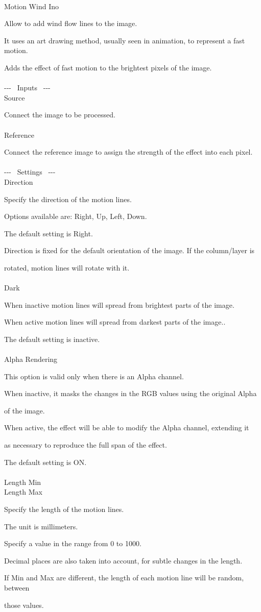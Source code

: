 \documentclass[a4paper,12pt]{article}
\begin{document}
\thispagestyle{empty}

\Large
\noindent \\
Motion Wind Ino\medskip
\par
\normalsize
Allow to add wind flow lines to the image.
\par
It uses an art drawing method, usually seen in animation, to represent a fast motion.\par
Adds the effect of fast motion to the brightest pixels of the image.\\
\\
-{-}- \ Inputs \ -{-}-\\
Source\par
Connect the image to be processed.\\
\\
Reference\par
Connect the reference image to assign the strength of the effect into each pixel.\\
\\
-{-}- \ Settings \ -{-}-\\
Direction\par
Specify the direction of the motion lines.\par
Options available are: Right, Up, Left, Down.\par
The default setting is Right.\par
Direction is fixed for the default orientation of the image. If the column/layer is\par 
rotated, motion lines will rotate with it.\\
\\
Dark\par
When inactive motion lines will spread from brightest parts of the image.\par
When active motion lines will spread from darkest parts of the image..\par
The default setting is inactive.\\
\\
Alpha Rendering\par
This option is valid only when there is an Alpha channel.\par
When inactive, it masks the changes in the RGB values using the original Alpha\par 
of the image.\par
When active, the effect will be able to modify the Alpha channel, extending it\par 
as necessary to reproduce the full span of the effect.\par
The default setting is ON.\\
\\
Length Min\\
Length Max\par
Specify the length of the motion lines.\par
The unit is millimeters.\par
Specify a value in the range from 0 to 1000.\par
Decimal places are also taken into account, for subtle changes in the length.\par
If Min and Max are different, the length of each motion line will be random, between\par 
those values.
\end{document}
